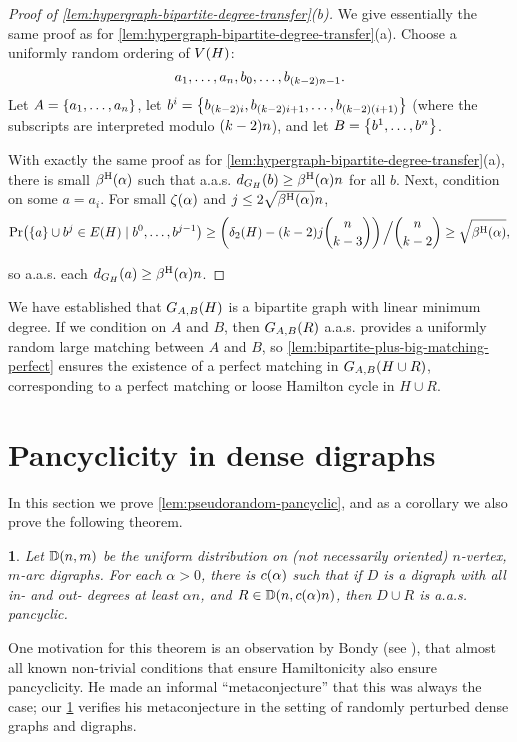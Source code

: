 \documentclass[11pt,english]{article}
\theoremstyle{plain}
\newtheorem{thm}{\protect\theoremname}
\theoremstyle{definition}
\theoremstyle{definition}
\theoremstyle{plain}
\theoremstyle{plain}
\theoremstyle{plain}
\theoremstyle{plain}
\theoremstyle{remark}
\theoremstyle{remark}
\let\originalleft\left
\let\originalright\right
\renewcommand{\left}{\mathopen{}\mathclose\bgroup\originalleft}
\renewcommand{\right}{\aftergroup\egroup\originalright}
\providecommand{\theoremname}{Theorem}
\begin{document}
\begin{proof}
[Proof of \ref{lem:hypergraph-bipartite-degree-transfer}(b)]We give
essentially the same proof as for \ref{lem:hypergraph-bipartite-degree-transfer}(a).
Choose a uniformly random ordering of $V\left(H\right)$: 
\[
a_{1},\dots,a_{n},b_{0},\dots,b_{\left(k-2\right)n-1}.
\]
Let $A=\left\{ a_{1},\dots,a_{n}\right\} $, let $b^{i}=\left\{ b_{\left(k-2\right)i},b_{\left(k-2\right)i+1},\dots,b_{\left(k-2\right)\left(i+1\right)}\right\} $
(where the subscripts are interpreted modulo $\left(k-2\right)n$),
and let $B=\left\{ b^{1},\dots,b^{n}\right\} $.

With exactly the same proof as for \ref{lem:hypergraph-bipartite-degree-transfer}(a),
there is small $\aham\left(\alpha\right)$ such that a.a.s. $d_{G_{H}}\left(b\right)\ge\aham\left(\alpha\right)n$
for all $b$. Next, condition on some $a=a_{i}$. For small $\zeta\left(\alpha\right)$
and $j\le2\sqrt{\aham\left(\alpha\right)}n$, 
\[
\Pr\left(\left\{ a\right\} \cup b^{j}\in E\left(H\right)\mid b^{0},\dots,b^{j-1}\right)\ge\left(\delta_{2}\left(H\right)-\left(k-2\right)j{n \choose k-3}\right)\left.\vphantom{\sum}\right/{n \choose k-2}\ge\sqrt{\aham\left(\alpha\right)},
\]


so a.a.s. each $d_{G_{H}}\left(a\right)\ge\aham\left(\alpha\right)n$.
\end{proof}
We have established that $G_{A,B}\left(H\right)$ is a bipartite graph
with linear minimum degree. If we condition on $A$ and $B$, then
$G_{A,B}\left(R\right)$ a.a.s. provides a uniformly random large
matching between $A$ and $B$, so \ref{lem:bipartite-plus-big-matching-perfect}
ensures the existence of a perfect matching in $G_{A,B}\left(H\cup R\right)$,
corresponding to a perfect matching or loose Hamilton cycle in $H\cup R$.


\section{\label{sec:digraphs}Pancyclicity in dense digraphs}

In this section we prove \ref{lem:pseudorandom-pancyclic}, and as
a corollary we also prove the following theorem.
\begin{thm}
\label{thm:smoothed-pancyclic}Let $\DD\left(n,m\right)$ be the uniform
distribution on (not necessarily oriented) $n$-vertex, $m$-arc digraphs.
For each $\alpha>0$, there is $\cdi\left(\alpha\right)$ such that
if $D$ is a digraph with all in- and out- degrees at least $\alpha n$,
and $R\in\DD\left(n,\cdi\left(\alpha\right)n\right)$, then $D\cup R$
is a.a.s. pancyclic.
\end{thm}
One motivation for this theorem is an observation by Bondy (see \cite{Bon75}),
that almost all known non-trivial conditions that ensure Hamiltonicity
also ensure pancyclicity. He made an informal ``metaconjecture''
that this was always the case; our \ref{thm:smoothed-pancyclic} verifies
his metaconjecture in the setting of randomly perturbed dense graphs
and digraphs.
\end{document}
